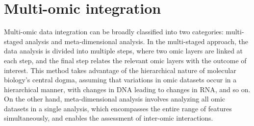 \documentclass[
]{book}
\newenvironment{Shaded}{\begin{snugshade}}{\end{snugshade}}
\newcommand{\AttributeTok}[1]{\textcolor[rgb]{0.77,0.63,0.00}{#1}}
\newcommand{\CommentTok}[1]{\textcolor[rgb]{0.56,0.35,0.01}{\textit{#1}}}
\newcommand{\DecValTok}[1]{\textcolor[rgb]{0.00,0.00,0.81}{#1}}
\newcommand{\FloatTok}[1]{\textcolor[rgb]{0.00,0.00,0.81}{#1}}
\newcommand{\FunctionTok}[1]{\textcolor[rgb]{0.00,0.00,0.00}{#1}}
\newcommand{\NormalTok}[1]{#1}
\newcommand{\OtherTok}[1]{\textcolor[rgb]{0.56,0.35,0.01}{#1}}
\newcommand{\SpecialCharTok}[1]{\textcolor[rgb]{0.00,0.00,0.00}{#1}}
\newcommand{\StringTok}[1]{\textcolor[rgb]{0.31,0.60,0.02}{#1}}
\begin{document}
\begin{Shaded}
\end{Shaded}

\hypertarget{multi-omic-integration}{%
\chapter{Multi-omic integration}\label{multi-omic-integration}}

Multi-omic data integration can be broadly classified into two categories: multi-staged analysis and meta-dimensional analysis. In the multi-staged approach, the data analysis is divided into multiple steps, where two omic layers are linked at each step, and the final step relates the relevant omic layers with the outcome of interest. This method takes advantage of the hierarchical nature of molecular biology's central dogma, assuming that variations in omic datasets occur in a hierarchical manner, with changes in DNA leading to changes in RNA, and so on. On the other hand, meta-dimensional analysis involves analyzing all omic datasets in a single analysis, which encompasses the entire range of features simultaneously, and enables the assessment of inter-omic interactions.
\end{document}
